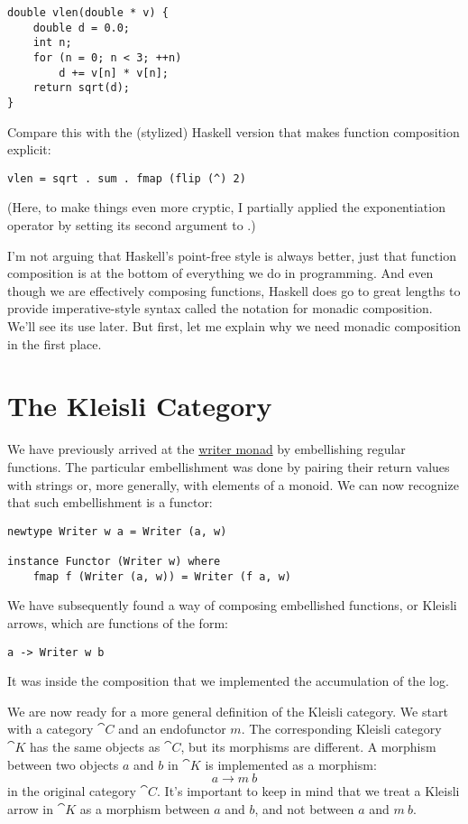 \begin{Verbatim}
double vlen(double * v) {
    double d = 0.0;
    int n;
    for (n = 0; n < 3; ++n)
        d += v[n] * v[n];
    return sqrt(d);
}
\end{Verbatim}
Compare this with the (stylized) Haskell version that makes function
composition explicit:

\begin{Verbatim}
vlen = sqrt . sum . fmap (flip (^) 2)
\end{Verbatim}
(Here, to make things even more cryptic, I partially applied the
exponentiation operator \code{(\^{})} by setting its second argument
to .)

I'm not arguing that Haskell's point-free style is always better, just
that function composition is at the bottom of everything we do in
programming. And even though we are effectively composing functions,
Haskell does go to great lengths to provide imperative-style syntax
called the  notation for monadic composition. We'll see its
use later. But first, let me explain why we need monadic composition in
the first place.

\section{The Kleisli Category}

We have previously arrived at the
\hyperref[kleisli-categories]{writer
monad} by embellishing regular functions. The particular embellishment
was done by pairing their return values with strings or, more generally,
with elements of a monoid. We can now recognize that such embellishment
is a functor:

\begin{Verbatim}
newtype Writer w a = Writer (a, w)

instance Functor (Writer w) where
    fmap f (Writer (a, w)) = Writer (f a, w)
\end{Verbatim}
We have subsequently found a way of composing embellished functions, or
Kleisli arrows, which are functions of the form:

\begin{Verbatim}
a -> Writer w b
\end{Verbatim}
It was inside the composition that we implemented the accumulation of
the log.

We are now ready for a more general definition of the Kleisli category.
We start with a category $\cat{C}$ and an endofunctor $m$. The
corresponding Kleisli category $\cat{K}$ has the same objects as
$\cat{C}$, but its morphisms are different. A morphism between two
objects $a$ and $b$ in $\cat{K}$ is implemented as a
morphism:
\[a \to m\ b\]
in the original category $\cat{C}$. It's important to keep in mind that
we treat a Kleisli arrow in $\cat{K}$ as a morphism between $a$
and $b$, and not between $a$ and $m\ b$.

